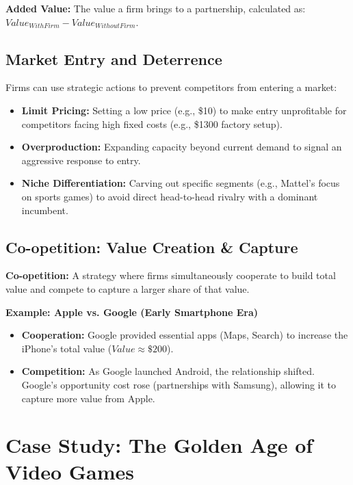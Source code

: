 \textbf{Added Value:} The value a firm brings to a partnership, calculated as:
$Value_{WithFirm} - Value_{WithoutFirm}$.

\subsection{Market Entry and Deterrence}
Firms can use strategic actions to prevent competitors from entering a market:
\begin{itemize}
    \item \textbf{Limit Pricing:} Setting a low price (e.g., \$10) to make entry unprofitable for
          competitors facing high fixed costs (e.g., \$1300 factory setup). \item \textbf{Overproduction:} Expanding capacity beyond current demand to signal an
          aggressive response to entry. \item \textbf{Niche Differentiation:} Carving out specific segments (e.g., Mattel's focus on
          sports games) to avoid direct head-to-head rivalry with a dominant incumbent.
\end{itemize}

\subsection{Co-opetition: Value Creation \& Capture}
\textbf{Co-opetition:} A strategy where firms simultaneously cooperate to build total
value and compete to capture a larger share of that value.

\textbf{Example: Apple vs. Google (Early Smartphone Era)}
\begin{itemize}
    \item \textbf{Cooperation:} Google provided essential apps (Maps, Search) to increase the
          iPhone's total value ($Value \approx \$200$).
    \item \textbf{Competition:} As Google launched Android, the relationship shifted. Google's
          opportunity cost rose (partnerships with Samsung), allowing it to capture more
          value from Apple.
\end{itemize}

\section{Case Study: The Golden Age of Video Games}
